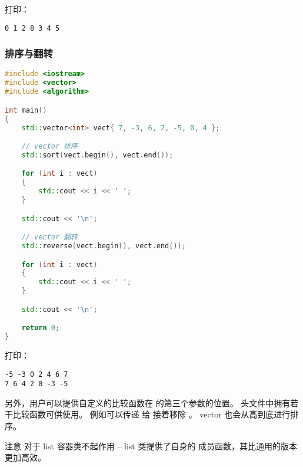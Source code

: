 \documentclass[../../LearnCpp.tex]{subfiles}
\begin{document}
打印：

\begin{lstlisting}
0 1 2 8 3 4 5
\end{lstlisting}

\subsubsection*{排序与翻转}

\begin{lstlisting}[language=C++]
#include <iostream>
#include <vector>
#include <algorithm>

int main()
{
    std::vector<int> vect{ 7, -3, 6, 2, -5, 0, 4 };

    // vector 排序
    std::sort(vect.begin(), vect.end());

    for (int i : vect)
    {
        std::cout << i << ' ';
    }

    std::cout << '\n';

    // vector 翻转
    std::reverse(vect.begin(), vect.end());

    for (int i : vect)
    {
        std::cout << i << ' ';
    }

    std::cout << '\n';

    return 0;
}
\end{lstlisting}

打印：

\begin{lstlisting}
-5 -3 0 2 4 6 7
7 6 4 2 0 -3 -5
\end{lstlisting}

另外，用户可以提供自定义的比较函数在  的第三个参数的位置。
 头文件中拥有若干比较函数可供使用。
例如可以传递  给  接着移除 。
vector 也会从高到底进行排序。

注意  对于 list 容器类不起作用 --
list 类提供了自身的  成员函数，其比通用的版本更加高效。
\end{document}
